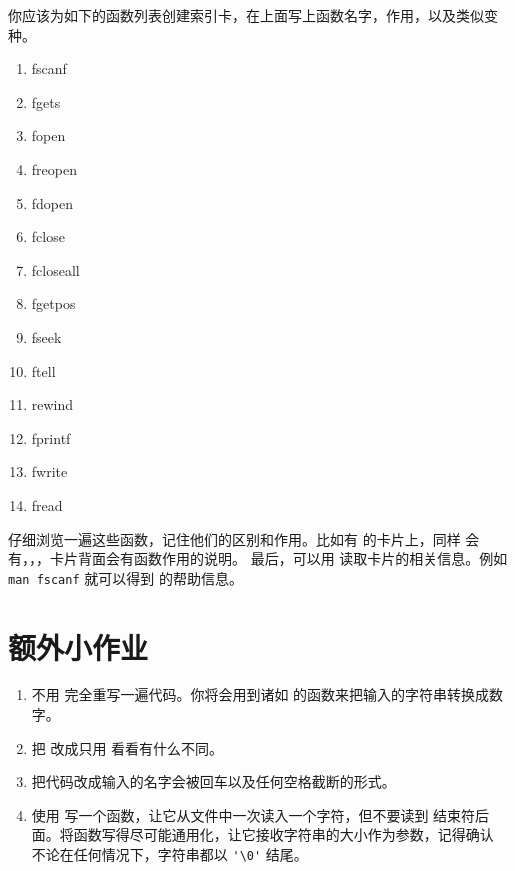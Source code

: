 你应该为如下的函数列表创建索引卡，在上面写上函数名字，作用，以及类似变种。

\begin{enumerate}
\item fscanf
\item fgets
\item fopen
\item freopen
\item fdopen
\item fclose
\item fcloseall
\item fgetpos
\item fseek
\item ftell
\item rewind
\item fprintf
\item fwrite
\item fread
\end{enumerate}

仔细浏览一遍这些函数，记住他们的区别和作用。比如有  的卡片上，同样
会有，，，卡片背面会有函数作用的说明。
最后，可以用  读取卡片的相关信息。例如 \verb|man fscanf| 就可以得到 
 的帮助信息。 

\section{额外小作业}

\begin{enumerate}
\item 不用  完全重写一遍代码。你将会用到诸如  
    的函数来把输入的字符串转换成数字。
\item 把  改成只用  看看有什么不同。
\item 把代码改成输入的名字会被回车以及任何空格截断的形式。
\item 使用  写一个函数，让它从文件中一次读入一个字符，但不要读到
    结束符后面。将函数写得尽可能通用化，让它接收字符串的大小作为参数，记得确认
    不论在任何情况下，字符串都以 \verb|'\0'| 结尾。
\end{enumerate}
